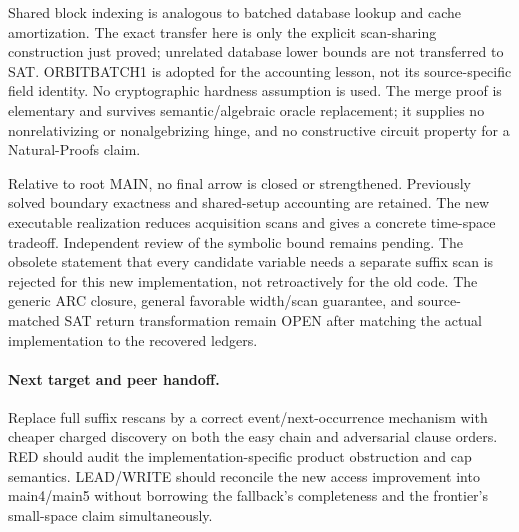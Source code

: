 \documentclass[11pt]{article}
\begin{document}
Shared block indexing is analogous to batched database lookup and cache amortization. The exact transfer here is only the explicit scan-sharing construction just proved; unrelated database lower bounds are not transferred to SAT. ORBITBATCH1 is adopted for the accounting lesson, not its source-specific field identity. No cryptographic hardness assumption is used. The merge proof is elementary and survives semantic/algebraic oracle replacement; it supplies no nonrelativizing or nonalgebrizing hinge, and no constructive circuit property for a Natural-Proofs claim.

Relative to root MAIN, no final arrow is closed or strengthened. Previously solved boundary exactness and shared-setup accounting are retained. The new executable realization reduces acquisition scans and gives a concrete time-space tradeoff. Independent review of the symbolic bound remains pending. The obsolete statement that every candidate variable needs a separate suffix scan is rejected for this new implementation, not retroactively for the old code. The generic ARC closure, general favorable width/scan guarantee, and source-matched SAT return transformation remain OPEN after matching the actual implementation to the recovered ledgers.

\paragraph{Next target and peer handoff.}
Replace full suffix rescans by a correct event/next-occurrence mechanism with cheaper charged discovery on both the easy chain and adversarial clause orders. RED should audit the implementation-specific product obstruction and cap semantics. LEAD/WRITE should reconcile the new access improvement into main4/main5 without borrowing the fallback's completeness and the frontier's small-space claim simultaneously.
\end{document}
